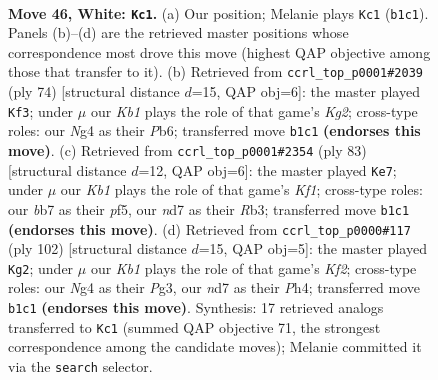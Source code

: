 \documentclass[11pt]{article}
\begin{document}
\clearpage

\begin{figure}[p]\centering
\begin{subfigure}{0.46\textwidth}\centering
\resizebox{\linewidth}{!}{%
\newchessgame
\chessboard[
  setfen={6k1/1b1n4/8/8/p2p2N1/P5P1/1PP5/1K6 w - - 10 46},
  showmover=false,
  pgfstyle=straightmove, color=movearrow, markmove={b1-c1}
]}
\caption{}
\end{subfigure}\hfill
\begin{subfigure}{0.46\textwidth}\centering
\resizebox{\linewidth}{!}{%
\newchessgame
\chessboard[
  setfen={3n2k1/8/1P4p1/7p/7P/6P1/5PK1/8 w - - 1 38},
  showmover=false,
  pgfstyle=straightmove, color=movearrow, markmove={g2-f3}
]}
\caption{}
\end{subfigure}
\\[4pt]
\begin{subfigure}{0.46\textwidth}\centering
\resizebox{\linewidth}{!}{%
\newchessgame
\chessboard[
  setfen={5k2/5pp1/7p/3pPP2/6P1/1r6/5K2/R7 b - - 1 42},
  showmover=false,
  pgfstyle=straightmove, color=movearrow, markmove={f8-e7}
]}
\caption{}
\end{subfigure}\hfill
\begin{subfigure}{0.46\textwidth}\centering
\resizebox{\linewidth}{!}{%
\newchessgame
\chessboard[
  setfen={8/p7/3k4/1p3p1p/1P5P/P3P1P1/5K2/8 w - - 20 52},
  showmover=false,
  pgfstyle=straightmove, color=movearrow, markmove={f2-g2}
]}
\caption{}
\end{subfigure}
\caption{\textbf{Move 46, White: \texttt{Kc1}.} (a) Our position; Melanie plays \texttt{Kc1} (\texttt{b1c1}). Panels (b)--(d) are the retrieved master positions whose correspondence most drove this move (highest QAP objective among those that transfer to it). (b) Retrieved from \texttt{ccrl\_top\_p0001\#2039} (ply 74) [structural distance $d$=15, QAP obj=6]: the master played \texttt{Kf3}; under $\mu$ our \emph{Kb1} plays the role of that game's \emph{Kg2}; cross-type roles: our \emph{N}g4 as their \emph{P}b6; transferred move \texttt{b1c1} \textbf{(endorses this move)}. (c) Retrieved from \texttt{ccrl\_top\_p0001\#2354} (ply 83) [structural distance $d$=12, QAP obj=6]: the master played \texttt{Ke7}; under $\mu$ our \emph{Kb1} plays the role of that game's \emph{Kf1}; cross-type roles: our \emph{b}b7 as their \emph{p}f5, our \emph{n}d7 as their \emph{R}b3; transferred move \texttt{b1c1} \textbf{(endorses this move)}. (d) Retrieved from \texttt{ccrl\_top\_p0000\#117} (ply 102) [structural distance $d$=15, QAP obj=5]: the master played \texttt{Kg2}; under $\mu$ our \emph{Kb1} plays the role of that game's \emph{Kf2}; cross-type roles: our \emph{N}g4 as their \emph{P}g3, our \emph{n}d7 as their \emph{P}h4; transferred move \texttt{b1c1} \textbf{(endorses this move)}. Synthesis: 17 retrieved analogs transferred to \texttt{Kc1} (summed QAP objective 71, the strongest correspondence among the candidate moves); Melanie committed it via the \texttt{search} selector.}
\label{fig:thought-m90}
\end{figure}
\end{document}
